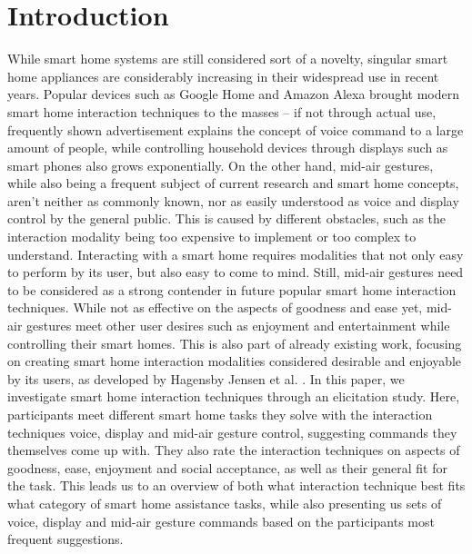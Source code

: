 \documentclass[sigchi]{acmart}
\begin{document}
	
	
	
	
	\maketitle
	
	\section{Introduction}
	While smart home systems are still considered sort of a novelty, singular smart home appliances are considerably increasing in their widespread use in recent years. Popular devices such as Google Home and Amazon Alexa brought modern smart home interaction techniques to the masses – if not through actual use, frequently shown advertisement explains the concept of voice command to a large amount of people, while controlling household devices through displays such as smart phones also grows exponentially. 
	On the other hand, mid-air gestures, while also being a frequent subject of current research and smart home concepts, aren’t neither as commonly known, nor as easily understood as voice and display control by the general public. This is caused by different obstacles, such as the interaction modality being too expensive to implement or too complex to understand. Interacting with a smart home requires modalities that not only easy to perform by its user, but also easy to come to mind. Still, mid-air gestures need to be considered as a strong contender in future popular smart home interaction techniques. While not as effective on the aspects of goodness and ease yet, mid-air gestures meet other user desires such as enjoyment and entertainment while controlling their smart homes. This is also part of already existing work, focusing on creating smart home interaction modalities considered desirable and enjoyable by its users, as developed by Hagensby Jensen et al. \cite{Jensen.2018}.  
	In this paper, we investigate smart home interaction techniques through an elicitation study. Here, participants meet different smart home tasks they solve with the interaction techniques voice, display and mid-air gesture control, suggesting commands they themselves come up with. They also rate the interaction techniques on aspects of goodness, ease, enjoyment and social acceptance, as well as their general fit for the task. This leads us to an overview of both what interaction technique best fits what category of smart home assistance tasks, while also presenting us sets of voice, display and mid-air gesture commands based on the participants most frequent suggestions. 
\end{document}
